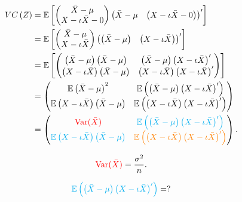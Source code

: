 \documentclass{tstextbook}
\DeclareMathOperator{\Var}{Var}
\begin{document}
\begin{example}
\begin{align*}
	VC\left(Z\right) & =\mathbb{E}\left[\begin{pmatrix}\bar{X}-\mu\\
		X-\iota\bar{X}-0
	\end{pmatrix}\begin{pmatrix}\bar{X}-\mu & \left(X-\iota\bar{X}-0\right)\end{pmatrix}^{\prime}\right]\\
	& =\mathbb{E}\left[\begin{pmatrix}\bar{X}-\mu\\
		X-\iota\bar{X}
	\end{pmatrix}\begin{pmatrix}\left(\bar{X}-\mu\right) & \left(X-\iota\bar{X}\right)\end{pmatrix}^{\prime}\right]\\
	& =\mathbb{E}\left[\begin{pmatrix}\left(\bar{X}-\mu\right)\left(\bar{X}-\mu\right) & \left(\bar{X}-\mu\right)\left(X-\iota\bar{X}\right)^{\prime}\\
		\left(X-\iota\bar{X}\right)\left(\bar{X}-\mu\right) & \left(X-\iota\bar{X}\right)\left(X-\iota\bar{X}\right)^{\prime}
	\end{pmatrix}\right]\\
	& =\begin{pmatrix}\mathbb{E}\left(\bar{X}-\mu\right)^{2} & \mathbb{E}\left(\left(\bar{X}-\mu\right)\left(X-\iota\bar{X}\right)^{\prime}\right)\\
		\mathbb{E}\left(X-\iota\bar{X}\right)\left(\bar{X}-\mu\right) & \mathbb{E}\left(\left(X-\iota\bar{X}\right)\left(X-\iota\bar{X}\right)^{\prime}\right)
	\end{pmatrix}\\
	& =\begin{pmatrix}\textcolor{red}{\Var(\bar{X})} & \textcolor{cyan}{\mathbb{E}\left(\left(\bar{X}-\mu\right)\left(X-\iota\bar{X}\right)^{\prime}\right)}\\
		\textcolor{cyan}{\mathbb{E}\left(X-\iota\bar{X}\right)\left(\bar{X}-\mu\right)} & \textcolor{orange}{\mathbb{E}\left(\left(X-\iota\bar{X}\right)\left(X-\iota\bar{X}\right)^{\prime}\right)}
	\end{pmatrix}.
\end{align*}


\[
\textcolor{red}{\Var(\bar{X})}=\frac{\sigma^{2}}{n}.
\]



\[
\textcolor{cyan}{\mathbb{E}\left(\left(\bar{X}-\mu\right)\left(X-\iota\bar{X}\right)^{\prime}\right)}=?
\]


\end{example}
\end{document}
